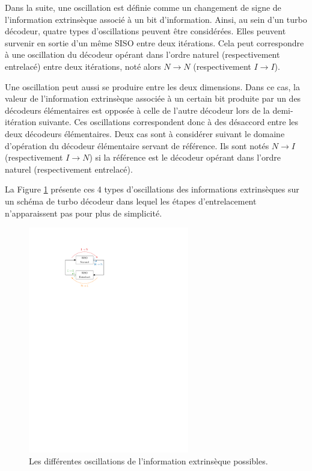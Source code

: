 Dans la suite, une oscillation est définie comme un changement de signe de l'information extrinsèque associé à un bit
d'information. Ainsi, au sein d'un turbo décodeur, quatre types d'oscillations peuvent être considérées. Elles peuvent 
survenir en sortie d'un même SISO entre deux itérations.  Cela peut correspondre à une oscillation du décodeur opérant 
dans l'ordre naturel (respectivement entrelacé) entre deux itérations, noté alors $N\rightarrow N$ (respectivement 
$I\rightarrow I$). 

Une oscillation peut aussi se produire entre les deux dimensions. Dans ce cas, la valeur de l'information extrinsèque 
associée à un certain bit produite par un des décodeurs élémentaires est opposée à celle de l'autre décodeur lors de la 
demi-itération suivante. Ces oscillations correspondent donc à des désaccord entre les deux décodeurs élémentaires. Deux 
cas sont à considérer suivant le domaine d'opération du décodeur élémentaire servant de référence. Ils sont notés 
$N\rightarrow I$ (respectivement $I\rightarrow N$) si la référence est le décodeur opérant dans l'ordre naturel 
(respectivement entrelacé).

La Figure \ref{fig:osc} présente ces 4 types d’oscillations des informations extrinsèques sur un schéma de turbo 
décodeur dans lequel les étapes d'entrelacement n’apparaissent pas pour plus de simplicité.

\begin{figure}[tb]
	\centering
	\includegraphics[width=7cm]{main/ch2_fig/ipe/osc.pdf}
	\caption{\label{fig:osc}Les différentes oscillations de l'information extrinsèque possibles.}
\end{figure}

